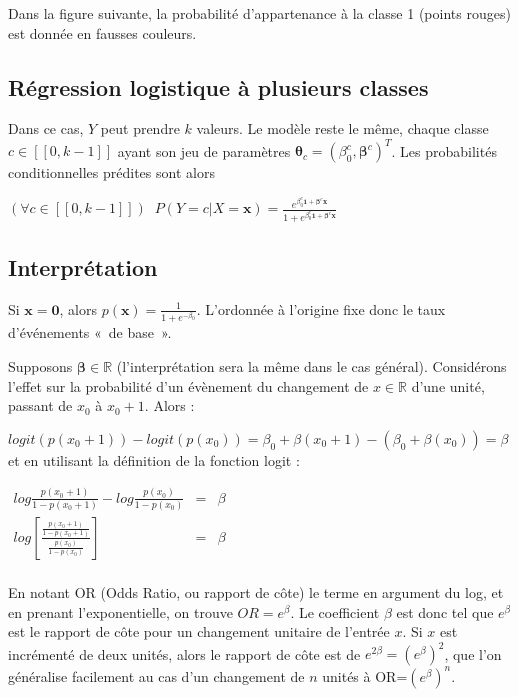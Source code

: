 \documentclass[letterpaper,10pt,french]{sphinxmanual}
\begin{document}
\sphinxAtStartPar
Dans la figure suivante, la probabilité d’appartenance à la classe 1 (points rouges) est donnée en fausses couleurs.

\sphinxAtStartPar
{}


\subsection{Régression logistique à plusieurs classes}
\label{\detokenize{regression:regression-logistique-a-plusieurs-classes}}
\sphinxAtStartPar
Dans ce cas, \(Y\) peut prendre \(k\) valeurs. Le modèle reste le même, chaque classe \(c\in[\![0,k-1]\!]\) ayant son jeu de paramètres \(\boldsymbol\theta_c=(\beta^c_0,\boldsymbol\beta^c)^T\). Les probabilités conditionnelles prédites sont alors

\sphinxAtStartPar
\((\forall c\in[\![0,k-1]\!])\;\;P(Y=c|X=\mathbf x) = \frac{e^{\beta^c_0\mathbf 1 + \boldsymbol\beta^c\mathbf x}}{1+e^{\beta^c_0\mathbf 1 + \boldsymbol\beta^c\mathbf x}}\)


\subsection{Interprétation}
\label{\detokenize{regression:interpretation}}
\sphinxAtStartPar
Si \(\mathbf x=\mathbf 0\), alors \(p(\mathbf x)=\frac{1}{1+e^{-\beta_0}}\). L’ordonnée à l’origine fixe donc le taux d’événements « de base ».

\sphinxAtStartPar
Supposons \(\boldsymbol\beta\in\mathbb{R}\) (l’interprétation sera la même dans le cas général). Considérons l’effet sur la probabilité d’un évènement du changement de \(x\in\mathbb{R}\) d’une unité, passant de \(x_0\) à \(x_0+1\). Alors :

\sphinxAtStartPar
\(logit(p(x_0+1))-logit(p(x_0)) = \beta_0+\beta(x_0+1)-(\beta_0+\beta(x_0)) = \beta\)
et en utilisant la définition de la fonction logit :

\sphinxAtStartPar
\(\begin{eqnarray*}
log \frac{p( x_0+1)}{1-p(x_0+1)}-log \frac{p( x_0)}{1-p(x_0)} &=& \beta\\
log \left  [\frac{\frac{p( x_0+1)}{1-p(x_0+1)}}{\frac{p( x_0)}{1-p(x_0)}} \right ]&=& \beta\\
\end{eqnarray*}\)

\sphinxAtStartPar
En notant OR (Odds Ratio, ou rapport de côte) le terme en argument du log, et en prenant l’exponentielle, on trouve \(OR=e^\beta\). Le coefficient \(\beta\) est donc tel que \(e^\beta\) est le rapport de côte pour un changement unitaire de l’entrée \(x\). Si \(x\) est incrémenté de deux unités, alors le rapport de côte est de \(e^{2\beta}=(e^\beta)^2\), que l’on généralise facilement au cas d’un changement de \(n\) unités à OR=\((e^\beta)^n\).
\end{document}
